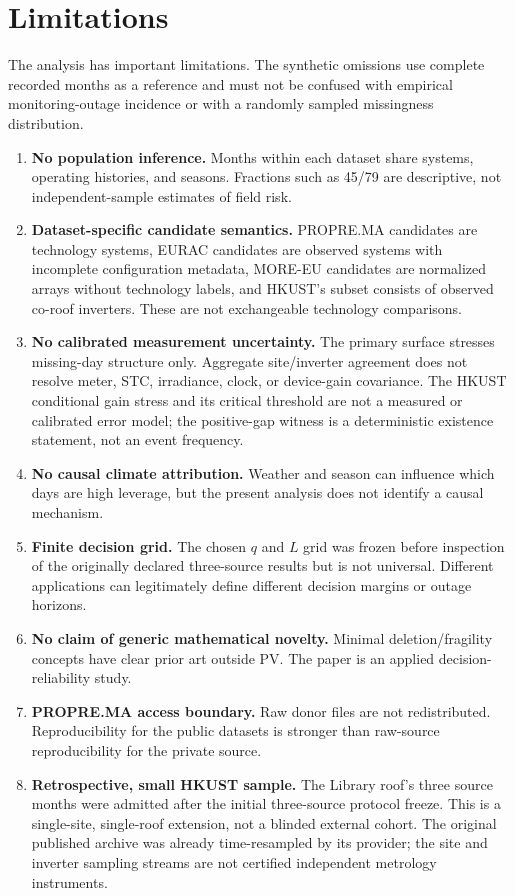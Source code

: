 \documentclass[preprint,12pt]{elsarticle}
\begin{document}
\section{Limitations}
The analysis has important limitations. The synthetic omissions use complete recorded months as a reference and must not be confused with empirical monitoring-outage incidence or with a randomly sampled missingness distribution.
\begin{enumerate}[leftmargin=1.5em]
    \item \textbf{No population inference.} Months within each dataset share systems, operating histories, and seasons. Fractions such as 45/79 are descriptive, not independent-sample estimates of field risk.
    \item \textbf{Dataset-specific candidate semantics.} PROPRE.MA candidates are technology systems, EURAC candidates are observed systems with incomplete configuration metadata, MORE-EU candidates are normalized arrays without technology labels, and HKUST's subset consists of observed co-roof inverters. These are not exchangeable technology comparisons.
    \item \textbf{No calibrated measurement uncertainty.} The primary surface stresses missing-day structure only. Aggregate site/inverter agreement does not resolve meter, STC, irradiance, clock, or device-gain covariance. The HKUST conditional gain stress and its critical threshold are not a measured or calibrated error model; the positive-gap witness is a deterministic existence statement, not an event frequency.
    \item \textbf{No causal climate attribution.} Weather and season can influence which days are high leverage, but the present analysis does not identify a causal mechanism.
    \item \textbf{Finite decision grid.} The chosen $q$ and $L$ grid was frozen before inspection of the originally declared three-source results but is not universal. Different applications can legitimately define different decision margins or outage horizons.
    \item \textbf{No claim of generic mathematical novelty.} Minimal deletion/fragility concepts have clear prior art outside PV. The paper is an applied decision-reliability study.
    \item \textbf{PROPRE.MA access boundary.} Raw donor files are not redistributed. Reproducibility for the public datasets is stronger than raw-source reproducibility for the private source.
    \item \textbf{Retrospective, small HKUST sample.} The Library roof's three source months were admitted after the initial three-source protocol freeze. This is a single-site, single-roof extension, not a blinded external cohort. The original published archive was already time-resampled by its provider; the site and inverter sampling streams are not certified independent metrology instruments.
\end{enumerate}
\end{document}
